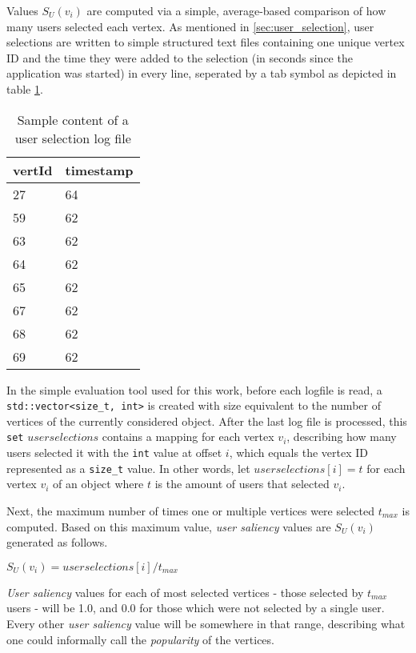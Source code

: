 Values $S_{U}(v_i)$ are computed via a simple, average-based comparison of how many users selected each vertex. As mentioned in \ref{sec:user_selection}, user selections are written to simple structured text files containing one unique vertex ID and the time they were added to the selection (in seconds since the application was started) in every line, seperated by a tab symbol as depicted in table \ref{tab:user_selection_log_file}.

\begin{table}[]
\centering
	\begin{tabular}{l|l}
	vertId & timestamp \\ \hline
	27 & 64 \\
	59 & 62 \\
	63 & 62 \\
	64 & 62 \\
	65 & 62 \\
	67 & 62 \\
	68 & 62 \\
	69 & 62
	\end{tabular}
	\caption{Sample content of a user selection log file}
	\label{tab:user_selection_log_file}
\end{table}

In the simple evaluation tool used for this work, before each logfile is read, a \texttt{std::vector<size\_t, int>} is created with size equivalent to the number of vertices of the currently considered object. After the last log file is processed, this \texttt{set} $userselections$ contains a mapping for each vertex $v_i$, describing how many users selected it with the \texttt{int} value at offset $i$, which equals the vertex ID represented as a \texttt{size\_t} value. In other words, let $userselections[i] = t$ for each vertex $v_i$ of an object where $t$ is the amount of users that selected $v_i$.

Next, the maximum number of times one or multiple vertices were selected $t_{max}$ is computed. Based on this maximum value, \textit{user saliency} values are $S_{U}(v_i)$ generated as follows.

$S_{U}(v_i) = userselections[i]/t_{max}$

\textit{User saliency} values for each of most selected vertices - those selected by $t_{max}$ users - will be 1.0, and 0.0 for those which were not selected by a single user. Every other \textit{user saliency} value will be somewhere in that range, describing what one could informally call the \textit{popularity} of the vertices.

